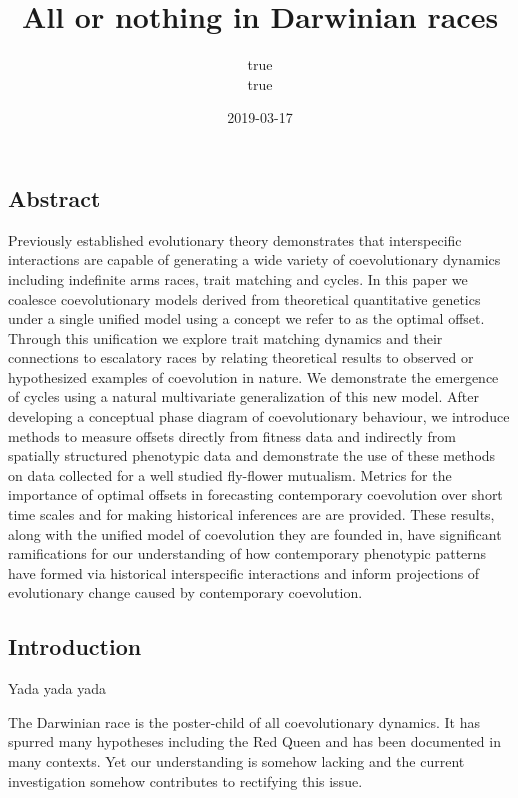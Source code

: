 \documentclass[]{article}
\title{All or nothing in Darwinian races}
\author{true \\ true}
\date{2019-03-17}
\begin{document}
\maketitle

{
\setcounter{tocdepth}{3}
\tableofcontents
}
\newcommand{\R}{\mathbb{R}}
\newcommand{\E}{\mathbb{E}}
\newcommand{\V}{\mathbb{V}}
\newcommand{\Z}{\mathbb{Z}}
\newcommand{\N}{\mathbb{N}}
\newcommand{\B}{\mathscr{B}}
\newcommand{\ra}{\rightarrow}

\hypertarget{abstract}{%
\subsection{Abstract}\label{abstract}}

Previously established evolutionary theory demonstrates that
interspecific interactions are capable of generating a wide variety of
coevolutionary dynamics including indefinite arms races, trait matching
and cycles. In this paper we coalesce coevolutionary models derived from
theoretical quantitative genetics under a single unified model using a
concept we refer to as the optimal offset. Through this unification we
explore trait matching dynamics and their connections to escalatory
races by relating theoretical results to observed or hypothesized
examples of coevolution in nature. We demonstrate the emergence of
cycles using a natural multivariate generalization of this new model.
After developing a conceptual phase diagram of coevolutionary behaviour,
we introduce methods to measure offsets directly from fitness data and
indirectly from spatially structured phenotypic data and demonstrate the
use of these methods on data collected for a well studied fly-flower
mutualism. Metrics for the importance of optimal offsets in forecasting
contemporary coevolution over short time scales and for making
historical inferences are are provided. These results, along with the
unified model of coevolution they are founded in, have significant
ramifications for our understanding of how contemporary phenotypic
patterns have formed via historical interspecific interactions and
inform projections of evolutionary change caused by contemporary
coevolution.

\hypertarget{introduction}{%
\subsection{Introduction}\label{introduction}}

Yada yada yada

The Darwinian race is the poster-child of all coevolutionary dynamics.
It has spurred many hypotheses including the Red Queen and has been
documented in many contexts. Yet our understanding is somehow lacking
and the current investigation somehow contributes to rectifying this
issue.
\end{document}
